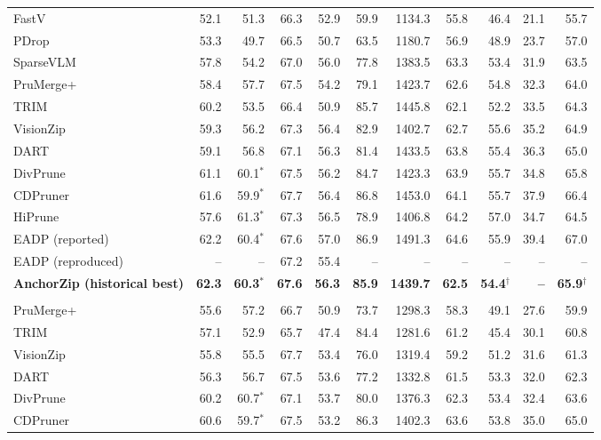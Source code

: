\documentclass[10pt,a4paper]{article}
\begin{document}
{\begin{tabular}{lrrrrrrrrrr}
FastV & 52.1 & 51.3 & 66.3 & 52.9 & 59.9 & 1134.3 & 55.8 & 46.4 & 21.1 & 55.7 \\
PDrop & 53.3 & 49.7 & 66.5 & 50.7 & 63.5 & 1180.7 & 56.9 & 48.9 & 23.7 & 57.0 \\
SparseVLM & 57.8 & 54.2 & 67.0 & 56.0 & 77.8 & 1383.5 & 63.3 & 53.4 & 31.9 & 63.5 \\
PruMerge+ & 58.4 & 57.7 & 67.5 & 54.2 & 79.1 & 1423.7 & 62.6 & 54.8 & 32.3 & 64.0 \\
TRIM & 60.2 & 53.5 & 66.4 & 50.9 & 85.7 & 1445.8 & 62.1 & 52.2 & 33.5 & 64.3 \\
VisionZip & 59.3 & 56.2 & 67.3 & 56.4 & 82.9 & 1402.7 & 62.7 & 55.6 & 35.2 & 64.9 \\
DART & 59.1 & 56.8 & 67.1 & 56.3 & 81.4 & 1433.5 & 63.8 & 55.4 & 36.3 & 65.0 \\
DivPrune & 61.1 & 60.1$^{*}$ & 67.5 & 56.2 & 84.7 & 1423.3 & 63.9 & 55.7 & 34.8 & 65.8 \\
CDPruner & 61.6 & 59.9$^{*}$ & 67.7 & 56.4 & 86.8 & 1453.0 & 64.1 & 55.7 & 37.9 & 66.4 \\
HiPrune & 57.6 & 61.3$^{*}$ & 67.3 & 56.5 & 78.9 & 1406.8 & 64.2 & 57.0 & 34.7 & 64.5 \\
EADP (reported) & 62.2 & 60.4$^{*}$ & 67.6 & 57.0 & 86.9 & 1491.3 & 64.6 & 55.9 & 39.4 & 67.0 \\
EADP (reproduced) & -- & -- & 67.2 & 55.4 & -- & -- & -- & -- & -- & -- \\
\textbf{AnchorZip (historical best)} & \textbf{62.3} & \textbf{60.3$^{*}$} & \textbf{67.6} & \textbf{56.3} & \textbf{85.9} & \textbf{1439.7} & \textbf{62.5} & \textbf{54.4$^{\dagger}$} & \textbf{--} & \textbf{65.9$^{\dagger}$} \\
\rowcolor{black!12}\multicolumn{11}{c}{\textit{Retain 160 tokens (nominal)}} \\
PruMerge+ & 55.6 & 57.2 & 66.7 & 50.9 & 73.7 & 1298.3 & 58.3 & 49.1 & 27.6 & 59.9 \\
TRIM & 57.1 & 52.9 & 65.7 & 47.4 & 84.4 & 1281.6 & 61.2 & 45.4 & 30.1 & 60.8 \\
VisionZip & 55.8 & 55.5 & 67.7 & 53.4 & 76.0 & 1319.4 & 59.2 & 51.2 & 31.6 & 61.3 \\
DART & 56.3 & 56.7 & 67.5 & 53.6 & 77.2 & 1332.8 & 61.5 & 53.3 & 32.0 & 62.3 \\
DivPrune & 60.2 & 60.7$^{*}$ & 67.1 & 53.7 & 80.0 & 1376.3 & 62.3 & 53.4 & 32.4 & 63.6 \\
CDPruner & 60.6 & 59.7$^{*}$ & 67.5 & 53.2 & 86.3 & 1402.3 & 63.6 & 53.8 & 35.0 & 65.0 \\

\end{tabular}}
\end{document}
